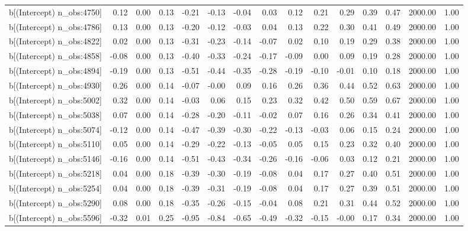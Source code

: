 \begin{table}[ht]
\begin{tabular}{rrrrrrrrrrrrrrr}
  b[(Intercept) n\_obs:4750] & 0.12 & 0.00 & 0.13 & -0.21 & -0.13 & -0.04 & 0.03 & 0.12 & 0.21 & 0.29 & 0.39 & 0.47 & 2000.00 & 1.00 \\ 
  b[(Intercept) n\_obs:4786] & 0.13 & 0.00 & 0.13 & -0.20 & -0.12 & -0.03 & 0.04 & 0.13 & 0.22 & 0.30 & 0.41 & 0.49 & 2000.00 & 1.00 \\ 
  b[(Intercept) n\_obs:4822] & 0.02 & 0.00 & 0.13 & -0.31 & -0.23 & -0.14 & -0.07 & 0.02 & 0.10 & 0.19 & 0.29 & 0.38 & 2000.00 & 1.00 \\ 
  b[(Intercept) n\_obs:4858] & -0.08 & 0.00 & 0.13 & -0.40 & -0.33 & -0.24 & -0.17 & -0.09 & 0.00 & 0.09 & 0.19 & 0.28 & 2000.00 & 1.00 \\ 
  b[(Intercept) n\_obs:4894] & -0.19 & 0.00 & 0.13 & -0.51 & -0.44 & -0.35 & -0.28 & -0.19 & -0.10 & -0.01 & 0.10 & 0.18 & 2000.00 & 1.00 \\ 
  b[(Intercept) n\_obs:4930] & 0.26 & 0.00 & 0.14 & -0.07 & -0.00 & 0.09 & 0.16 & 0.26 & 0.36 & 0.44 & 0.52 & 0.63 & 2000.00 & 1.00 \\ 
  b[(Intercept) n\_obs:5002] & 0.32 & 0.00 & 0.14 & -0.03 & 0.06 & 0.15 & 0.23 & 0.32 & 0.42 & 0.50 & 0.59 & 0.67 & 2000.00 & 1.00 \\ 
  b[(Intercept) n\_obs:5038] & 0.07 & 0.00 & 0.14 & -0.28 & -0.20 & -0.11 & -0.02 & 0.07 & 0.16 & 0.26 & 0.34 & 0.41 & 2000.00 & 1.00 \\ 
  b[(Intercept) n\_obs:5074] & -0.12 & 0.00 & 0.14 & -0.47 & -0.39 & -0.30 & -0.22 & -0.13 & -0.03 & 0.06 & 0.15 & 0.24 & 2000.00 & 1.00 \\ 
  b[(Intercept) n\_obs:5110] & 0.05 & 0.00 & 0.14 & -0.29 & -0.22 & -0.13 & -0.05 & 0.05 & 0.15 & 0.23 & 0.32 & 0.40 & 2000.00 & 1.00 \\ 
  b[(Intercept) n\_obs:5146] & -0.16 & 0.00 & 0.14 & -0.51 & -0.43 & -0.34 & -0.26 & -0.16 & -0.06 & 0.03 & 0.12 & 0.21 & 2000.00 & 1.00 \\ 
  b[(Intercept) n\_obs:5218] & 0.04 & 0.00 & 0.18 & -0.39 & -0.30 & -0.19 & -0.08 & 0.04 & 0.17 & 0.27 & 0.40 & 0.51 & 2000.00 & 1.00 \\ 
  b[(Intercept) n\_obs:5254] & 0.04 & 0.00 & 0.18 & -0.39 & -0.31 & -0.19 & -0.08 & 0.04 & 0.17 & 0.27 & 0.39 & 0.51 & 2000.00 & 1.00 \\ 
  b[(Intercept) n\_obs:5290] & 0.08 & 0.00 & 0.18 & -0.35 & -0.26 & -0.15 & -0.04 & 0.08 & 0.21 & 0.31 & 0.44 & 0.52 & 2000.00 & 1.00 \\ 
  b[(Intercept) n\_obs:5596] & -0.32 & 0.01 & 0.25 & -0.95 & -0.84 & -0.65 & -0.49 & -0.32 & -0.15 & -0.00 & 0.17 & 0.34 & 2000.00 & 1.00 \\ 

\end{tabular}
\end{table}
